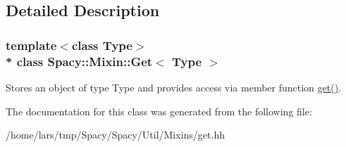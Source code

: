 \subsection{Detailed Description}
\subsubsection*{template$<$class Type$>$\\*
class Spacy\+::\+Mixin\+::\+Get$<$ Type $>$}

Stores an object of type Type and provides access via member function \hyperlink{classSpacy_1_1Mixin_1_1Get_aaa3afedcb9b9e943f81d1686b70417db}{get()}. 

The documentation for this class was generated from the following file\+:\begin{DoxyCompactItemize}
\item 
/home/lars/tmp/\+Spacy/\+Spacy/\+Util/\+Mixins/get.\+hh\end{DoxyCompactItemize}
